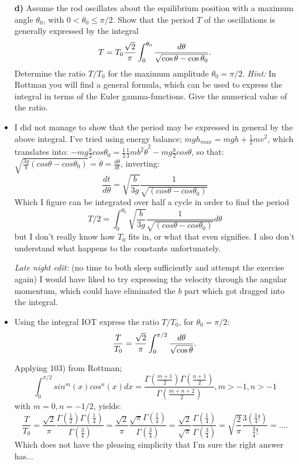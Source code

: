 \documentclass[11pt,a4paper]{report}
\newcounter{excount}[chapter]
\newenvironment{exercise}[1][]{\addtocounter{excount}{1} \noindent {\bf Problem
    \arabic{excount} \ \ #1}\hspace{2mm}}{\vspace{4mm}}
\begin{document}
\begin{exercise}
\begin{itemize}
\item[\bf d)] Assume the rod oscillates about the equilibrium position with a maximum angle $\theta_0$, with $0<\theta_0\leq \pi/2$. Show that the period $T$ of the oscillations is generally expressed by the integral
\begin{equation}
T=T_0 {\sqrt 2\over \pi} \int_0^{\theta_0}\frac{d\theta}{\sqrt{\cos\theta-\cos\theta_0}}.
\end{equation}
Determine the ratio $T/T_0$ for the maximum amplitude $\theta_0=\pi/2$. {\it Hint:} In Rottman you will find a general formula, which can be used to express the integral in terms of the Euler gamma-functions. Give the numerical value of the ratio.
\item I did not manage to show that the period may be expressed in general by the above integral. I've tried using energy balance; $mgh_{max}=mgh+\frac{1}{2}mv^2$, which translates into:
$-mg\frac{b}{2}cos \theta_0=\frac{1}{2}\frac{1}{3}mb^2\dot{\theta}^2-mg\frac{b}{2}cos \theta$, so that: $\sqrt{\frac{3g}{b}(cos \theta - cos \theta_0)}=\dot{\theta}=\frac{d\theta}{dt}$, inverting:
\begin{equation}
\frac{dt}{d\theta}=\sqrt{\frac{b}{3g}}\frac{1}{\sqrt{(cos \theta - cos \theta_0)}}
\end{equation}
Which I figure can be integrated over half a cycle in order to find the period 
\begin{equation}
T/2=\int_0^{\theta_0} \sqrt{\frac{b}{3g}}\frac{1}{\sqrt{(cos \theta - cos \theta_0)}} d\theta
\end{equation} but I don't really know how $T_0$ fits in, or what that even signifies. I also don't understand what happens to the constants unfortunately. \par  \textit{Late night edit:} (no time to both sleep sufficiently and attempt the exercise again) I would have liked to try expressing the velocity through the angular momentum, which could have eliminated the $b$ part which got dragged into the integral.


\item Using the integral IOT express the ratio $T/T_0$, for $\theta_0=\pi/2$:
\begin{equation}
\frac{T}{T_0}= {\sqrt 2\over \pi} \int_0^{\pi/2}\frac{d\theta}{\sqrt{\cos\theta}}.
\end{equation}

Applying 103) from Rottman; 
\begin{equation}
\int_0^{\pi/2} sin^m (x) cos^n(x) dx = \frac{\Gamma(\frac{m+1}{2})\Gamma(\frac{n+1}{2})}{\Gamma(\frac{m+n+2}{2})}, m>-1, n>-1
\end{equation}
with $m=0,n=-1/2$, yields:
\begin{equation}
\frac{T}{T_0}=\frac{\sqrt{2}}{\pi} \frac{\Gamma(\frac{1}{2})\Gamma(\frac{1}{4})}{\Gamma(\frac{3}{4})}=\frac{\sqrt{2}}{\pi}\frac{\sqrt{\pi}\Gamma(\frac{1}{4})}{\Gamma(\frac{3}{4})}=\frac{\sqrt{2}}{\sqrt{\pi}}\frac{\Gamma(\frac{1}{4})}{\Gamma(\frac{3}{4})}=\sqrt{\frac{2}{\pi}}\frac{3(\frac{1}{4}!)}{\frac{3}{4}!}=....
\end{equation}
Which does not have the pleasing simplicity  that I'm sure the right answer has...



\end{itemize}
\end{exercise}
\end{document}
